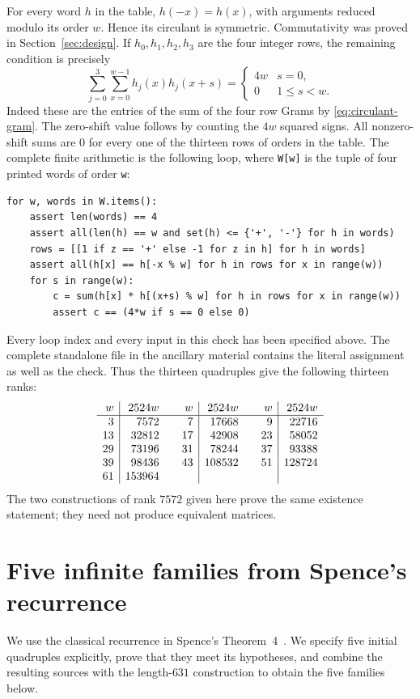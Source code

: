 \documentclass[10pt]{article}
\begin{document}
For every word $h$ in the table, $h(-x)=h(x)$, with arguments reduced
modulo its order $w$. Hence its circulant is symmetric. Commutativity was
proved in Section~\ref{sec:design}. If $h_0,h_1,h_2,h_3$ are the four
integer rows, the remaining condition is precisely
\[
 \sum_{j=0}^3\sum_{x=0}^{w-1}h_j(x)h_j(x+s)
 =\begin{cases}4w&s=0,\\0&1\leq s<w.\end{cases}
\]
Indeed these are the entries of the sum of the four row Grams by
\eqref{eq:circulant-gram}. The zero-shift value follows by counting the
$4w$ squared signs. All nonzero-shift sums are $0$ for every one of the
thirteen rows of orders in the table. The complete finite arithmetic is
the following loop, where \texttt{W[w]} is the tuple of four printed words
of order \texttt{w}:
\begin{verbatim}
for w, words in W.items():
    assert len(words) == 4
    assert all(len(h) == w and set(h) <= {'+', '-'} for h in words)
    rows = [[1 if z == '+' else -1 for z in h] for h in words]
    assert all(h[x] == h[-x % w] for h in rows for x in range(w))
    for s in range(w):
        c = sum(h[x] * h[(x+s) % w] for h in rows for x in range(w))
        assert c == (4*w if s == 0 else 0)
\end{verbatim}
Every loop index and every input in this check has been specified above.
The complete standalone file in the ancillary material contains the
literal assignment as well as the check.
Thus the thirteen quadruples give the following thirteen ranks:
\[
\begin{array}{r|r@{\qquad}r|r@{\qquad}r|r}
w&2524w&w&2524w&w&2524w\\\hline
3&7572&7&17668&9&22716\\
13&32812&17&42908&23&58052\\
29&73196&31&78244&37&93388\\
39&98436&43&108532&51&128724\\
61&153964&&&&
\end{array}
\]
The two constructions of rank $7572$ given here prove the same existence
statement; they need not produce equivalent matrices.


\section{Five infinite families from Spence's recurrence}\label{sec:spence-rigorous}

We use the classical recurrence in Spence's Theorem~4~\cite{spence}.
We specify five initial quadruples explicitly, prove that they meet its
hypotheses, and combine the resulting sources with the length-$631$
construction to obtain the five families below.
\end{document}
